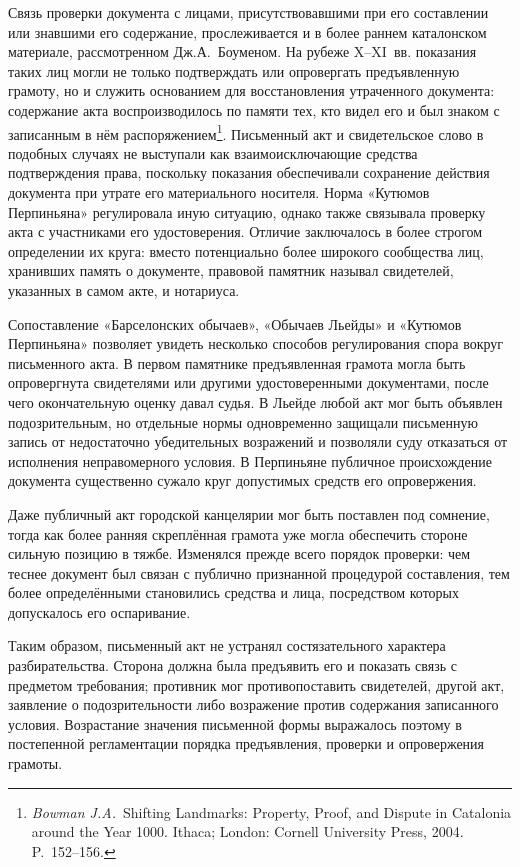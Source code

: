 Связь проверки документа с лицами, присутствовавшими при его составлении или знавшими его содержание, прослеживается и в более раннем каталонском материале, рассмотренном Дж.А.~Боуменом. На рубеже X--XI~вв. показания таких лиц могли не только подтверждать или опровергать предъявленную грамоту, но и служить основанием для восстановления утраченного документа: содержание акта воспроизводилось по памяти тех, кто видел его и был знаком с записанным в нём распоряжением\footnote{\emph{Bowman J.A.}~Shifting Landmarks: Property, Proof, and Dispute in Catalonia around the Year 1000. Ithaca; London: Cornell University Press, 2004. P.~152--156.}. Письменный акт и свидетельское слово в подобных случаях не выступали как взаимоисключающие средства подтверждения права, поскольку показания обеспечивали сохранение действия документа при утрате его материального носителя. Норма «Кутюмов Перпиньяна» регулировала иную ситуацию, однако также связывала проверку акта с участниками его удостоверения. Отличие заключалось в более строгом определении их круга: вместо потенциально более широкого сообщества лиц, хранивших память о документе, правовой памятник называл свидетелей, указанных в самом акте, и нотариуса.

Сопоставление «Барселонских обычаев», «Обычаев Льейды» и «Кутюмов Перпиньяна» позволяет увидеть несколько способов регулирования спора вокруг письменного акта. В первом памятнике предъявленная грамота могла быть опровергнута свидетелями или другими удостоверенными документами, после чего окончательную оценку давал судья. В Льейде любой акт мог быть объявлен подозрительным, но отдельные нормы одновременно защищали письменную запись от недостаточно убедительных возражений и позволяли суду отказаться от исполнения неправомерного условия. В Перпиньяне публичное происхождение документа существенно сужало круг допустимых средств его опровержения.

Даже публичный акт городской канцелярии мог быть поставлен под сомнение, тогда как более ранняя скреплённая грамота уже могла обеспечить стороне сильную позицию в тяжбе. Изменялся прежде всего порядок проверки: чем теснее документ был связан с публично признанной процедурой составления, тем более определёнными становились средства и лица, посредством которых допускалось его оспаривание.

Таким образом, письменный акт не устранял состязательного характера разбирательства. Сторона должна была предъявить его и показать связь с предметом требования; противник мог противопоставить свидетелей, другой акт, заявление о подозрительности либо возражение против содержания записанного условия. Возрастание значения письменной формы выражалось поэтому в постепенной регламентации порядка предъявления, проверки и опровержения грамоты.

